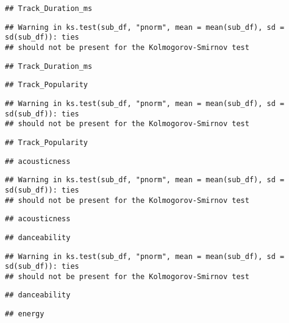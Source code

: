 \documentclass[
]{article}
\begin{document}
\begin{verbatim}
## Track_Duration_ms
\end{verbatim}

\begin{verbatim}
## Warning in ks.test(sub_df, "pnorm", mean = mean(sub_df), sd = sd(sub_df)): ties
## should not be present for the Kolmogorov-Smirnov test
\end{verbatim}

\begin{verbatim}
## Track_Duration_ms
\end{verbatim}

\begin{verbatim}
## Track_Popularity
\end{verbatim}

\begin{verbatim}
## Warning in ks.test(sub_df, "pnorm", mean = mean(sub_df), sd = sd(sub_df)): ties
## should not be present for the Kolmogorov-Smirnov test
\end{verbatim}

\begin{verbatim}
## Track_Popularity
\end{verbatim}

\begin{verbatim}
## acousticness
\end{verbatim}

\begin{verbatim}
## Warning in ks.test(sub_df, "pnorm", mean = mean(sub_df), sd = sd(sub_df)): ties
## should not be present for the Kolmogorov-Smirnov test
\end{verbatim}

\begin{verbatim}
## acousticness
\end{verbatim}

\begin{verbatim}
## danceability
\end{verbatim}

\begin{verbatim}
## Warning in ks.test(sub_df, "pnorm", mean = mean(sub_df), sd = sd(sub_df)): ties
## should not be present for the Kolmogorov-Smirnov test
\end{verbatim}

\begin{verbatim}
## danceability
\end{verbatim}

\begin{verbatim}
## energy
\end{verbatim}
\end{document}
